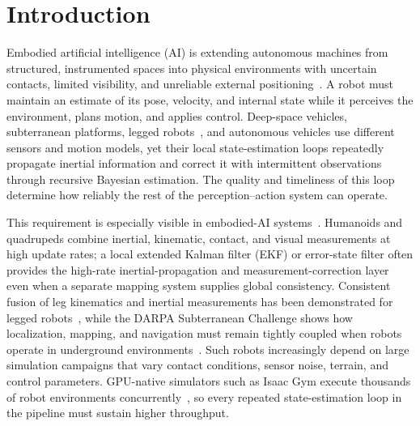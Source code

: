 \section{Introduction}
\label{sec:introduction}

Embodied artificial intelligence (AI) is extending autonomous machines from structured, instrumented spaces into physical environments with uncertain contacts, limited visibility, and unreliable external positioning~\cite{liu2025embodied-survey}. A robot must maintain an estimate of its pose, velocity, and internal state while it perceives the environment, plans motion, and applies control. Deep-space vehicles, subterranean platforms, legged robots~\cite{he2024legged-state,ou2024leg-kilo}, and autonomous vehicles use different sensors and motion models, yet their local state-estimation loops repeatedly propagate inertial information and correct it with intermittent observations through recursive Bayesian estimation. The quality and timeliness of this loop determine how reliably the rest of the perception--action system can operate.

This requirement is especially visible in embodied-AI systems~\cite{embodied-ai-survey}. Humanoids and quadrupeds combine inertial, kinematic, contact, and visual measurements at high update rates; a local extended Kalman filter (EKF) or error-state filter often provides the high-rate inertial-propagation and measurement-correction layer even when a separate mapping system supplies global consistency. Consistent fusion of leg kinematics and inertial measurements has been demonstrated for legged robots~\cite{bloesch2012}, while the DARPA Subterranean Challenge shows how localization, mapping, and navigation must remain tightly coupled when robots operate in underground environments~\cite{cerberus2022}. Such robots increasingly depend on large simulation campaigns that vary contact conditions, sensor noise, terrain, and control parameters. GPU-native simulators such as Isaac Gym execute thousands of robot environments concurrently~\cite{isaacgym2021}, so every repeated state-estimation loop in the pipeline must sustain higher throughput.

